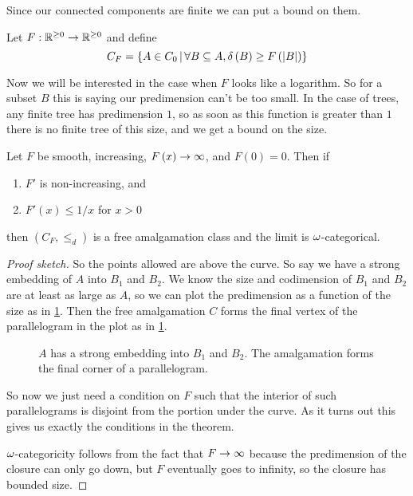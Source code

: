 \documentclass{amsart}
\begin{document}
Since our connected components are finite we can put a bound on them.

\begin{defn}
Let $F:\mathbb{R}^{\geq 0} \rightarrow\mathbb{R}^{\geq 0}$ and define
\begin{equation}
C_F = \left\{ A\in C_0 \, \middle\vert \, \forall B\subseteq A, \delta\left( B \right) \geq  F\left( \left| B \right| \right) 
\right\}
\end{equation}
\end{defn}

Now we will be interested in the case when $F$ looks like a logarithm.
So for a subset $B$ this is saying our predimension can't be too small. 
In the case of trees, any finite tree has predimension $1$, so as soon as this function is
greater than $1$ there is no finite tree of this size, and we get a bound on the size.

\begin{thm}
Let $F$ be smooth, increasing, $F\left( x \right) \rightarrow \infty$, and $F\left( 0
\right)=0$. Then if
\begin{enumerate}
\item $F'$ is non-increasing, and
\item $F'\left( x \right)\leq 1/x$ for $x>0$
\end{enumerate}
then $\left( C_F , \leq _d \right)$ is a free amalgamation class and the limit is
$\omega$-categorical.
\end{thm}

\begin{proof}[Proof sketch]
So the points allowed are above the curve.
So say we have a strong embedding of $A$ into $B_1$ and $B_2$. 
We know the size and codimension of $B_1$ and $B_2$ are at least as large as $A$, so
we can plot the predimension as a function of the size as in \cref{fig:prediagonal}.
Then the free amalgamation $C$ forms the final
vertex of the parallelogram in the plot as in \cref{fig:prediagonal}.
\begin{figure}
\begin{overlay}
\end{overlay}
\caption{$A$ has a strong embedding into $B_1$ and $B_2$. The amalgamation forms the final
corner of a parallelogram.}
\label{fig:prediagonal}
\end{figure}
So now we just need a condition on $F$ such that the interior of such parallelograms is
disjoint from the portion under the curve.
As it turns out this gives us exactly the conditions in the theorem.

$\omega$-categoricity follows from the fact that $F\rightarrow \infty$ because the predimension
of the closure can only go down, but $F$ eventually goes to infinity, so the closure has bounded size.
\end{proof}
\end{document}
